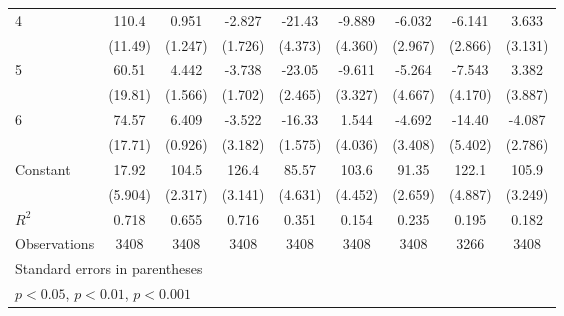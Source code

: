 \documentclass{article}
\begin{document}
{\begin{longtable}{l*{8}{c}}
4               &    110.4\sym{***}&    0.951         &   -2.827         &   -21.43\sym{***}&   -9.889\sym{*}  &   -6.032         &   -6.141\sym{*}  &    3.633         \\
                &  (11.49)         &  (1.247)         &  (1.726)         &  (4.373)         &  (4.360)         &  (2.967)         &  (2.866)         &  (3.131)         \\
5               &    60.51\sym{**} &    4.442\sym{**} &   -3.738\sym{*}  &   -23.05\sym{***}&   -9.611\sym{**} &   -5.264         &   -7.543         &    3.382         \\
                &  (19.81)         &  (1.566)         &  (1.702)         &  (2.465)         &  (3.327)         &  (4.667)         &  (4.170)         &  (3.887)         \\
6               &    74.57\sym{***}&    6.409\sym{***}&   -3.522         &   -16.33\sym{***}&    1.544         &   -4.692         &   -14.40\sym{*}  &   -4.087         \\
                &  (17.71)         &  (0.926)         &  (3.182)         &  (1.575)         &  (4.036)         &  (3.408)         &  (5.402)         &  (2.786)         \\
Constant        &    17.92\sym{**} &    104.5\sym{***}&    126.4\sym{***}&    85.57\sym{***}&    103.6\sym{***}&    91.35\sym{***}&    122.1\sym{***}&    105.9\sym{***}\\
                &  (5.904)         &  (2.317)         &  (3.141)         &  (4.631)         &  (4.452)         &  (2.659)         &  (4.887)         &  (3.249)         \\
\hline
\(R^{2}\)       &    0.718         &    0.655         &    0.716         &    0.351         &    0.154         &    0.235         &    0.195         &    0.182         \\
Observations    &     3408         &     3408         &     3408         &     3408         &     3408         &     3408         &     3266         &     3408         \\
\hline\hline
\multicolumn{9}{l}{\footnotesize Standard errors in parentheses}\\
\multicolumn{9}{l}{\footnotesize \sym{*} \(p<0.05\), \sym{**} \(p<0.01\), \sym{***} \(p<0.001\)}\\
\end{longtable}
}
\end{document}
